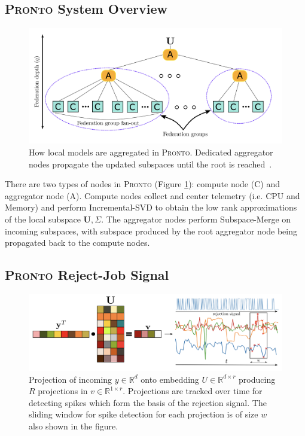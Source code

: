 \subsection{\protect\textsc{Pronto} System Overview}
\begin{figure}[ht]
    \centering
    \includegraphics[width=\textwidth]{images/pronto-agg.png}
    \caption{How local models are aggregated in \textsc{Pronto}. Dedicated aggregator
    nodes propagate the updated subspaces until the root is reached~\cite{grammenos_pronto_2021}.}
    \label{pronto-agg}
\end{figure}
There are two types of nodes in \textsc{Pronto} (Figure \ref{pronto-agg}):
compute node (C) and aggregator node (A). Compute nodes collect and center
telemetry (i.e. CPU and Memory) and perform Incremental-SVD to obtain the low
rank approximations of the local subspace $\mathbf{U},\Sigma$. The aggregator
nodes perform Subspace-Merge on incoming subspaces, with subspace produced by
the root aggregator node being propagated back to the compute nodes.

\subsection{\protect\textsc{Pronto} Reject-Job Signal}
\begin{figure}[ht]
    \centering
    \includegraphics[width=\textwidth]{images/pronto}
    \caption{Projection of incoming $y \in \mathbb{R}^d$ onto embedding $U \in
    \mathbb{R}^{d \times r}$ producing $R$ projections in $v \in \mathbb{R}^{1
    \times r}$. Projections are tracked over time for detecting spikes which
    form the basis of the rejection signal. The sliding window for spike
    detection for each projection is of size $w$ also shown in the figure.}
    \label{pronto-components}
\end{figure}

